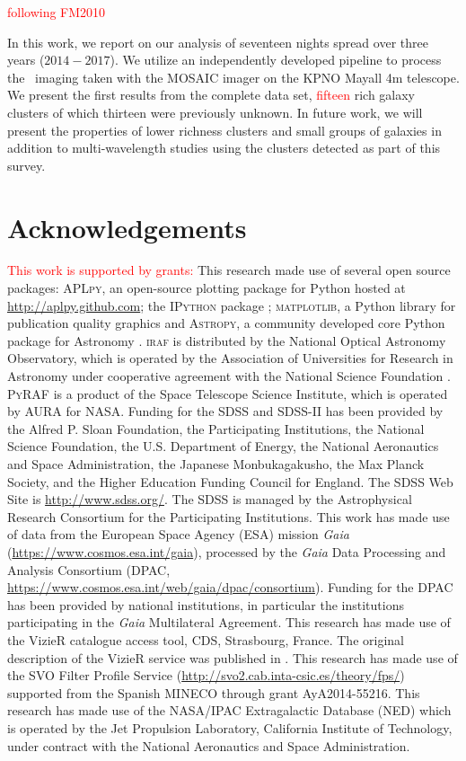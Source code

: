 \documentclass[apj, revtex4-1]{emulateapj}
\newcommand{\editorial}[1]{\textcolor{red}{#1}}
\begin{document}
\editorial{following FM2010}

In this work, we report on our analysis of seventeen nights spread over three years ($2014-2017$). We utilize an independently developed pipeline to process the \sdssg\sdssr\sdssi\sdssz\ imaging taken with the MOSAIC imager on the KPNO Mayall 4m telescope. We present the first results from the complete data set, \editorial{fifteen} rich galaxy clusters of which thirteen were previously unknown. In future work, we will present the properties of lower richness clusters and small groups of galaxies in addition to multi-wavelength studies using the clusters detected as part of this survey.

\section*{Acknowledgements}
\editorial{This work is supported by grants:}
This research made use of several open source packages: \textsc{APLpy}, an open-source plotting package for Python hosted at \url{http://aplpy.github.com}; the \textsc{IPython} package \citep{Perez2007}; \textsc{matplotlib}, a Python library for publication quality graphics \citep{Hunter2007} and \textsc{Astropy}, a community developed core Python package for Astronomy \citep{TheAstropyCollaboration2013}.
\textsc{iraf} is distributed by the National Optical Astronomy Observatory, which is operated by the Association of Universities for Research in Astronomy under cooperative agreement with the National Science Foundation \citep{Tody1993}.
\textsc{PyRAF} is a product of the Space Telescope Science Institute, which is operated by AURA for NASA.
Funding for the SDSS and SDSS-II has been provided by the Alfred P. Sloan Foundation, the Participating Institutions, the National Science Foundation, the U.S. Department of Energy, the National Aeronautics and Space Administration, the Japanese Monbukagakusho, the Max Planck Society, and the Higher Education Funding Council for England. The SDSS Web Site is \url{http://www.sdss.org/}. The SDSS is managed by the Astrophysical Research Consortium for the Participating Institutions.
This work has made use of data from the European Space Agency (ESA) mission {\it Gaia} (\url{https://www.cosmos.esa.int/gaia}), processed by the {\it Gaia} Data Processing and Analysis Consortium (DPAC, \url{https://www.cosmos.esa.int/web/gaia/dpac/consortium}). Funding for the DPAC has been provided by national institutions, in particular the institutions participating in the {\it Gaia} Multilateral Agreement.
This research has made use of the VizieR catalogue access tool, CDS, Strasbourg, France. The original description of the VizieR service was published in \cite{Ochsenbein2000}.
This research has made use of the SVO Filter Profile Service (\url{http://svo2.cab.inta-csic.es/theory/fps/}) supported from the Spanish MINECO through grant AyA2014-55216.
This research has made use of the NASA/IPAC Extragalactic Database (NED) which is operated by the Jet Propulsion Laboratory, California Institute of Technology, under contract with the National Aeronautics and Space Administration. 




\end{document}
